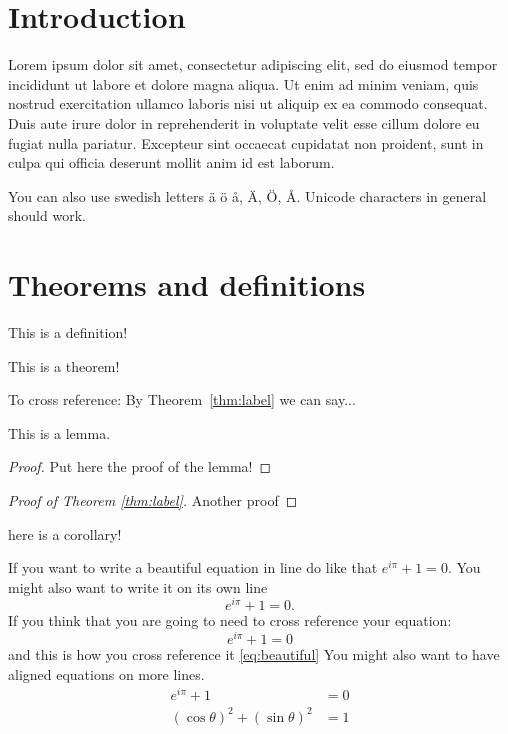 \clearpage{\thispagestyle{empty}\cleardoublepage}
\section{Introduction}
\label{sec:reference-intro}

Lorem ipsum dolor sit amet, consectetur adipiscing elit, sed do eiusmod tempor incididunt ut labore et dolore magna aliqua.
Ut enim ad minim veniam, quis nostrud exercitation ullamco laboris nisi ut aliquip ex ea commodo consequat. 
Duis aute irure dolor in reprehenderit in voluptate velit esse cillum dolore eu fugiat nulla pariatur. 
Excepteur sint occaecat cupidatat non proident, sunt in culpa qui officia deserunt mollit anim id est laborum.

You can also use swedish letters ä ö å, Ä, Ö, Å. Unicode characters in general should work.


\clearpage{\thispagestyle{empty}\cleardoublepage}
\section{Theorems and definitions}
\label{sec:theorems-definitions}

\begin{definition}
This is a definition!
\end{definition}

\begin{theorem}\label{thm:label}
This is a theorem!
\end{theorem}

To cross reference: By Theorem~\ref{thm:label} we can say...
\begin{lemma}
This is a lemma.
\end{lemma}
\begin{proof}
Put here the proof of the lemma!
\end{proof}


\begin{proof}[Proof of Theorem \ref{thm:label}]
Another proof
\end{proof}


\begin{corollary}
here is a corollary!
\end{corollary}

If you want to write a beautiful equation in line do like that $e^{i\pi}+1=0$.
You might also want to write it on its own line
\[
e^{i\pi}+1=0.
\]
If you think that you are going to need to cross reference your equation:
\begin{equation}\label{eq:beautiful}
e^{i\pi}+1=0
\end{equation}
and this is how you cross reference it \eqref{eq:beautiful}
You might also want to have aligned equations on more lines.
\begin{align}
    e^{i\pi}+1&=0\\
    (\cos\theta)^2+(\sin\theta)^2 &=1
\end{align}

